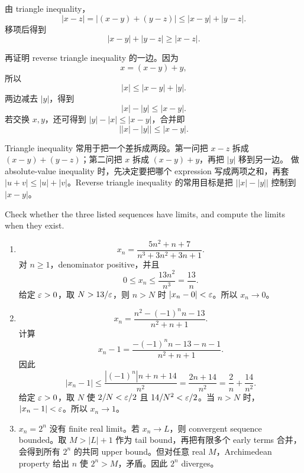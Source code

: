\begin{solution}
由 triangle inequality，
\[
  |x-z|=|(x-y)+(y-z)|\leq |x-y|+|y-z|.
\]
移项后得到
\[
  |x-y|+|y-z|\geq |x-z|.
\]

再证明 reverse triangle inequality 的一边。因为
\[
  x=(x-y)+y,
\]
所以
\[
  |x|\leq |x-y|+|y|.
\]
两边减去 \(|y|\)，得到
\[
  |x|-|y|\leq |x-y|.
\]
若交换 \(x,y\)，还可得到 \(|y|-|x|\leq|x-y|\)，合并即
\[
  \bigl||x|-|y|\bigr|\leq |x-y|.
\]
\end{solution}

\begin{explanation}
Triangle inequality 常用于把一个差拆成两段。第一问把 \(x-z\) 拆成
\((x-y)+(y-z)\)；第二问把 \(x\) 拆成 \((x-y)+y\)，再把 \(|y|\) 移到另一边。
做 absolute-value inequality 时，先决定要把哪个 expression 写成两项之和，再套
\(|u+v|\leq |u|+|v|\)。Reverse triangle inequality 的常用目标是把
\(\bigl||x|-|y|\bigr|\) 控制到 \(|x-y|\)。
\end{explanation}

\begin{exerciseblock}
Check whether the three listed sequences have limits, and compute the limits when
they exist.
\end{exerciseblock}

\begin{solution}
\begin{enumerate}[label=(\alph*)]
  \item
  \[
    x_n=\frac{5n^2+n+7}{n^3+3n^2+3n+1}.
  \]
  对 \(n\geq1\)，denominator positive，并且
  \[
    0\leq x_n
    \leq \frac{13n^2}{n^3}
    =\frac{13}{n}.
  \]
  给定 \(\varepsilon>0\)，取 \(N>13/\varepsilon\)，则 \(n>N\) 时 \(|x_n-0|<\varepsilon\)。所以
  \(x_n\to0\)。

  \item
  \[
    x_n=\frac{n^2-(-1)^n n-13}{n^2+n+1}.
  \]
  计算
  \[
    x_n-1
    =\frac{-(-1)^n n-13-n-1}{n^2+n+1}.
  \]
  因此
  \[
    |x_n-1|
    \leq\frac{|(-1)^n|n+n+14}{n^2}
    =\frac{2n+14}{n^2}
    =\frac2n+\frac{14}{n^2}.
  \]
  给定 \(\varepsilon>0\)，取 \(N\) 使 \(2/N<\varepsilon/2\) 且 \(14/N^2<\varepsilon/2\)。当
  \(n>N\) 时，\(|x_n-1|<\varepsilon\)。所以 \(x_n\to1\)。

  \item \(x_n=2^n\) 没有 finite real limit。若 \(x_n\to L\)，则 convergent
  sequence bounded。取 \(M>|L|+1\) 作为 tail bound，再把有限多个 early terms 合并，
  会得到所有 \(2^n\) 的共同 upper bound。但对任意 real \(M\)，Archimedean
  property 给出 \(n\) 使 \(2^n>M\)，矛盾。因此 \(2^n\) diverges。
\end{enumerate}
\end{solution}

